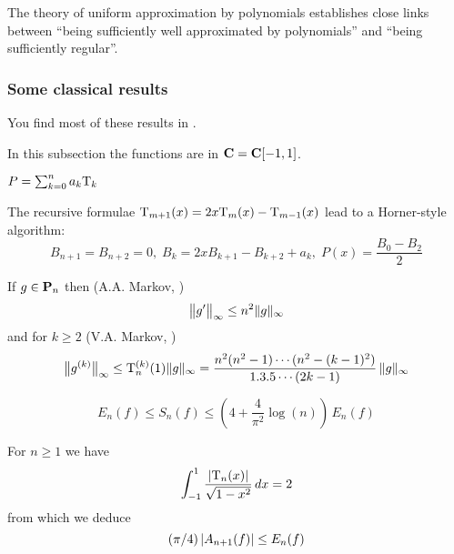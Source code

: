 The theory of uniform approximation by polynomials establishes close links between ``being sufficiently well approximated by polynomials'' and ``being sufficiently regular''.


\subsubsection{Some classical results}\label{subsubsec522}

You find most of these results in \cite{Ch}.

\smallskip  In this subsection the functions are in ${\bf C}={{\bf C}[-1,1]}$.

\smallskip {} $P=\sum_{k=0}^{n}a_k{\rm T}_k$

\noindent 
 The recursive formulae ${\rm T}_{m+1}(x) = 2x{\rm T}_m(x) - {\rm T}_{m-1}(x)$ lead to a Horner-style algorithm:
\[
B_{n+1} = B_{n+2} = 0, \; B_k = 2xB_{k+1} - B_{k+2} + a_k, \; P(x) = \frac 
{B_0 - B_2} {2}
\]

\smallskip{} 

\noindent 
If $g \in {\bf P}_n$ then (A.A. Markov, \cite[page 91]{Ch})
\begin{equation} \label{F 5.2.1}
\big\lVert  g'  \big\rVert_\infty \leq n^2 \lVert  g  \rVert_{\infty}
\end{equation}
and for $k \geq 2$ (V.A. Markov, \cite[Theorem 2.24]{Ri})
\begin{equation} \label{F 5.2.2}
\big\lVert  g^{(k)}  \big\rVert_\infty \leq {\rm T}_n^{(k)}(1) \lVert  g  \rVert_{\infty} = \frac {n^2(n^2-1)\cdots(n^2-(k-1)^2)} {1.3.5\cdots(2k-1)} \,\lVert  g  \rVert_\infty
\end{equation}


\smallskip{}
\begin{equation} \label{F 5.2.3}
E_n(f) \leq S_n(f) \leq \left(4+ \frac {4} {\pi^{2}} \log (n)\right)\,E_n(f)
\end{equation}

\smallskip{}

\noindent 
For $n \geq 1$ we have	
\[
\int_{-1}^{1} \frac {\left|{{\rm T}_n(x)}\right|} {\sqrt {1-x^2}}\,dx = 2
\]
from which we deduce 
\begin{equation} \label{F 5.2.4}
(\pi /4) \left|{A_{n+1}(f)}\right|  \leq E_n(f)
\end{equation}

